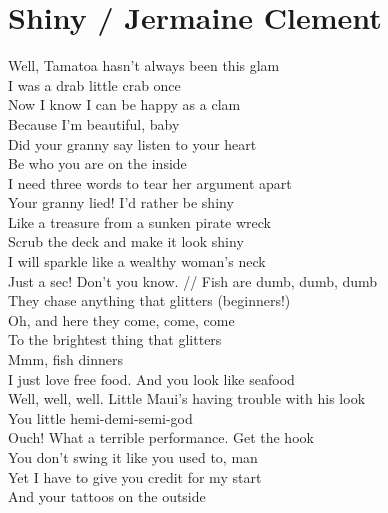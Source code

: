 \section{Shiny / Jermaine Clement}\label{sec:shiny}

\EminorEasy
\Aminor
\EflatMajor
\Gmajor
\Cmajor
\DmajorEasy
\BflatSeven

Well, Tamatoa hasn't always been this glam\\
I was a drab little crab once\\
Now I know I can be happy as a clam\\
Because I'm beautiful, baby \\
Did your granny say listen to your heart\\
Be who you are on the inside\\
I need three words to tear her argument apart\\
Your granny lied! I'd rather be shiny\\
Like a treasure from a sunken pirate wreck\\
Scrub the deck and make it look shiny\\
I will sparkle like a wealthy woman's neck\\
Just a sec! Don't you know. //
Fish are dumb, dumb, dumb\\
They chase anything that glitters (beginners!)\\
Oh, and here they come, come, come\\
To the brightest thing that glitters\\
Mmm, fish dinners\\
I just love free food. And you look like seafood \\
Well, well, well. Little Maui's having trouble with his look\\
You little hemi-demi-semi-god\\
Ouch! What a terrible performance. Get the hook\\
You don't swing it like you used to, man\\
Yet I have to give you credit for my start\\
And your tattoos on the outside\\
